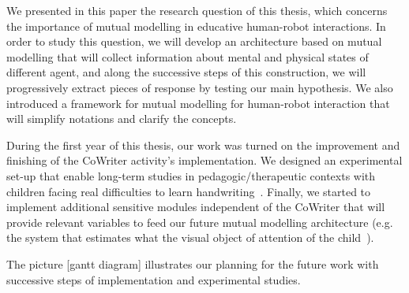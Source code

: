 \documentclass[10pt,a4paper,twocolumn]{article}
\begin{document}
We presented in this paper the research question of this thesis, which concerns the importance of mutual modelling in educative human-robot interactions. In order to study this question, we will develop an architecture based on mutual modelling that will collect information about mental and physical states of different agent, and along the successive steps of this construction, we will progressively extract pieces of response by testing our main hypothesis. We also introduced a framework for mutual modelling for human-robot interaction that will simplify notations and clarify the concepts. 

During the first year of this thesis, our work was turned on the improvement and finishing of the CoWriter activity's implementation. We designed an experimental set-up that enable long-term studies in pedagogic/therapeutic contexts with children facing real difficulties to learn handwriting~\cite{jacq2016building}. Finally, we started to implement additional sensitive modules independent of the CoWriter that will provide relevant variables to feed our future mutual modelling architecture (e.g. the system that estimates what the visual object of attention of the child~\cite{lemaignan2016realtime}).

The picture [gantt diagram] illustrates our planning for the future work with successive steps of implementation and experimental studies.






 
\end{document}
